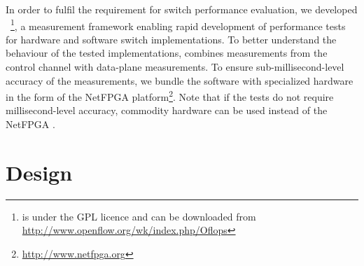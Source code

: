 In order to fulfil the requirement for \of switch performance evaluation, 
we developed \oflops~\footnote{\oflops is under
  the GPL licence and can be downloaded from
  \url{http://www.openflow.org/wk/index.php/Oflops}}, a measurement framework
enabling rapid development of performance tests for hardware and
software \of switch implementations. To better understand the behaviour of the
tested \of implementations, \oflops combines measurements from the \of control
channel with data-plane measurements. To ensure sub-millisecond-level accuracy
of the measurements, we bundle the \oflops software with specialized hardware in
the form of the NetFPGA platform\footnote{\url{http://www.netfpga.org}}.  Note
that if the tests do not require millisecond-level accuracy, commodity hardware
can be used instead of the NetFPGA \cite{pam-accuracy}.

\section{\oflops Design}\label{sec:oflops-design}

